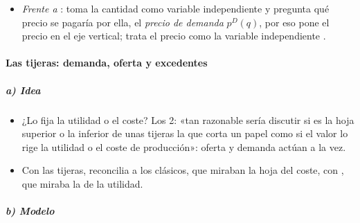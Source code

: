\documentclass[11pt]{article}
\begin{document}
\begin{itemize}
\begin{itemize}
  \item {}: sirven para pensar, pero el texto tiene que entenderse sin ellas;\footnote{En una carta de 1906 a  resume sus reglas:
\begin{itemize}
\item usar las matemáticas como un lenguaje abreviado, no como motor de la investigación;
\item traducir el resultado a palabras;
\item ilustrarlo con ejemplos de la vida real y quemar las matemáticas;
\item si no se encuentran ejemplos, quemar también lo traducido\nocite{Pigou1925Memorials}.
\end{itemize}}
  \item \emph{continuidad} con los clásicos, de los que se considera heredero, y con la biología: el lema de los \emph{Principles} es \emph{natura non facit saltum}, y «la meca del economista está en la biología económica más que en la dinámica económica»\nocite{Marshall1890Principles}.
  \end{itemize}
\item \emph{Frente a }: toma la cantidad como variable independiente y pregunta qué precio se pagaría por ella, el \emph{precio de demanda} $p^D(q)$, por eso pone el precio en el eje vertical;  trata el precio como la variable independiente .
\end{itemize}

\paragraph{Las tijeras: demanda, oferta y excedentes}

\subparagraph{a) Idea}

\begin{itemize}
\item ¿Lo fija la utilidad o el coste? Los 2: «tan razonable sería discutir si es la hoja superior o la inferior de unas tijeras la que corta un papel como si el valor lo rige la utilidad o el coste de producción»\nocite{Marshall1890Principles}: oferta y demanda actúan a la vez.
\item Con las tijeras,  reconcilia a los clásicos, que miraban la hoja del coste, con , que miraba la de la utilidad.
\end{itemize}

\subparagraph{b) Modelo}
\end{document}
